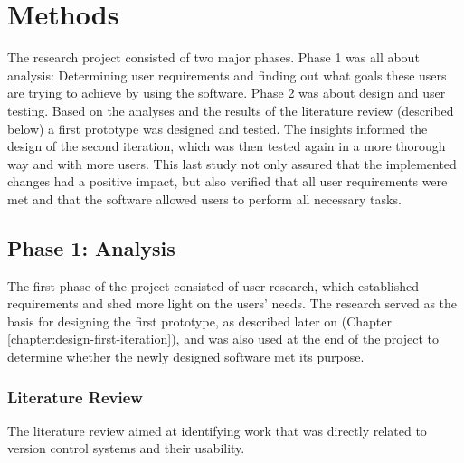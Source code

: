 \chapter{Methods} \label{chapter:methods}
The research project consisted of two major phases. Phase 1 was all about analysis: Determining user requirements and finding out what goals these users are trying to achieve by using the software. Phase 2 was about design and user testing. Based on the analyses and the results of the literature review (described below) a first prototype was designed and tested. The insights informed the design of the second iteration, which was then tested again in a more thorough way and with more users. This last study not only assured that the implemented changes had a positive impact, but also verified that all user requirements were met and that the software allowed users to perform all necessary tasks.

\section{Phase 1: Analysis}
The first phase of the project consisted of user research, which established requirements and shed more light on the users' needs. The research served as the basis for designing the first prototype, as described later on (Chapter \ref{chapter:design-first-iteration}), and was also used at the end of the project to determine whether the newly designed software met its purpose.

\subsection{Literature Review}
The literature review aimed at identifying work that was directly related to version control systems and their usability.


